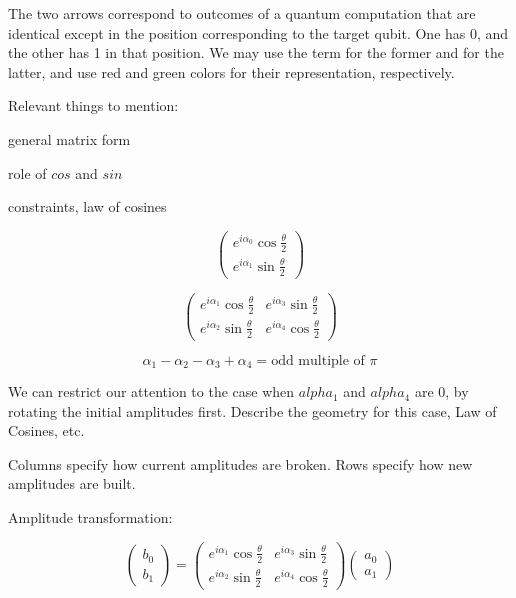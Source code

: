 \documentclass[11pt, letterpaper]{article}
\begin{document}
The  two arrows correspond to outcomes of a quantum computation that are identical except in the position corresponding to the target qubit. One has 0, and the other has 1 in that position. We may use the term  for the former and  for the latter, and use red and green colors for their representation, respectively.

Relevant things to mention:
\begin{compactitem}
\item  general matrix form 
\item  role of $cos$ and $sin$
\item constraints, law of cosines
\end{compactitem}

\begin{equation}
	\begin{pmatrix} e^{i\alpha_0}\cos\frac{\theta}{2}  \\  e^{i\alpha_1}\sin\frac{\theta}{2} \end{pmatrix}
\end{equation}

\begin{equation}
	\begin{pmatrix} e^{i\alpha_1}\cos\frac{\theta}{2} & e^{i\alpha_3}\sin\frac{\theta}{2}\\  e^{i\alpha_2}\sin\frac{\theta}{2} &  e^{i\alpha_4}\cos\frac{\theta}{2} \end{pmatrix}
\end{equation}

$$\alpha_1 - \alpha_2  - \alpha_3  + \alpha_4 = \text{odd multiple of }\pi$$

We can restrict our attention to the case when  $alpha_1$ and $alpha_4$ are $0$, by rotating the initial amplitudes first. Describe the geometry for this case, Law of Cosines, etc.

Columns specify how current amplitudes are broken. Rows specify how new amplitudes are built.

Amplitude transformation:

\begin{equation}
	\begin{pmatrix}b_0 \\ b_1 \end{pmatrix} =
		\begin{pmatrix} e^{i\alpha_1}\cos\frac{\theta}{2} & e^{i\alpha_3}\sin\frac{\theta}{2}\\  e^{i\alpha_2}\sin\frac{\theta}{2} &  e^{i\alpha_4}\cos\frac{\theta}{2} \end{pmatrix}
	\begin{pmatrix} a_0 \\ a_1 \end{pmatrix}
\end{equation}
\end{document}

